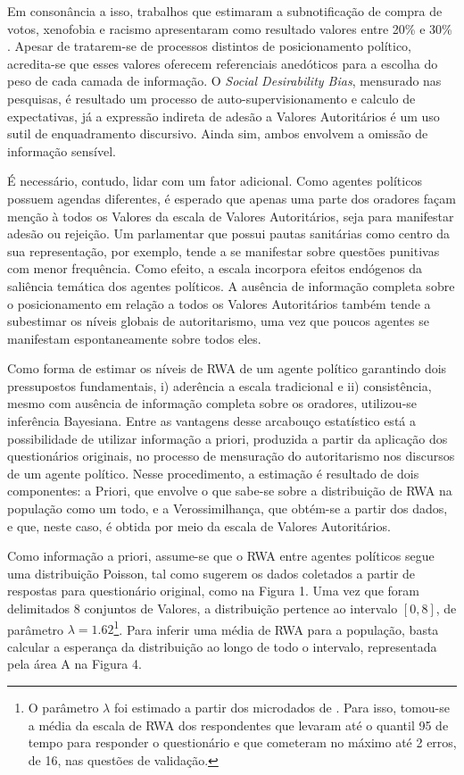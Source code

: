 \documentclass[
12pt,				%
openright,			%
twoside,			%
a4paper,			%
english,			%
french,				%
spanish,			%
brazil				%
]{abntex2}
\begin{document}
Em consonância a isso, trabalhos que estimaram a subnotificação de compra de votos, xenofobia e racismo apresentaram como resultado valores entre 20{\%} e 30{\%} \cite{rudmin1999norwegian,heerwig2009education,gonzalez2012vote}. 
Apesar de tratarem-se de processos distintos de posicionamento político, acredita-se que esses valores oferecem referenciais anedóticos para a escolha do peso de cada camada de informação. O \emph{Social Desirability Bias}, mensurado nas pesquisas, é resultado um processo de auto-supervisionamento e calculo de expectativas, já a expressão indireta de adesão a Valores Autoritários é um uso sutil de enquadramento discursivo. Ainda sim, ambos envolvem a omissão de informação sensível.

É necessário, contudo, lidar com um fator adicional. Como agentes políticos possuem agendas diferentes, é esperado que apenas uma parte dos oradores façam menção à todos os Valores da escala de Valores Autoritários, seja para manifestar adesão ou rejeição. Um parlamentar que possui pautas sanitárias como centro da sua representação, por exemplo, tende a se manifestar sobre questões punitivas com menor frequência. Como efeito, a escala incorpora efeitos endógenos da saliência temática dos agentes políticos. A ausência de informação completa sobre o posicionamento em relação a todos os Valores Autoritários também tende a subestimar os níveis globais de autoritarismo, uma vez que poucos agentes se manifestam espontaneamente sobre todos eles. 

Como forma de estimar os níveis de RWA de um agente político garantindo dois pressupostos fundamentais, i) aderência a escala tradicional e ii) consistência, mesmo com ausência de informação completa sobre os oradores, utilizou-se inferência Bayesiana. Entre as vantagens desse arcabouço estatístico está a possibilidade de utilizar informação a priori, produzida a partir da aplicação dos questionários originais, no processo de mensuração do autoritarismo nos discursos de um agente político. Nesse procedimento, a estimação é resultado de dois componentes: a Priori, que envolve o que sabe-se sobre a distribuição de RWA na população como um todo, e a Verossimilhança, que obtém-se a partir dos dados, e que, neste caso, é obtida por meio da escala de Valores Autoritários. 

Como informação a priori, assume-se que o RWA entre agentes políticos segue uma distribuição Poisson, tal como sugerem os dados coletados a partir de respostas para questionário original, como na Figura 1. Uma vez que foram delimitados 8 conjuntos de Valores, a distribuição pertence ao intervalo $[0, 8]$, de parâmetro $\lambda = 1.62$\footnote{O parâmetro $\lambda$ foi estimado a partir dos microdados de . Para isso, tomou-se a média da escala de RWA dos respondentes que levaram até o quantil 95 de tempo para responder o questionário e que cometeram no máximo até 2 erros, de 16, nas questões de validação.}. Para inferir uma média de RWA para a população, basta calcular a esperança da distribuição ao longo de todo o intervalo, representada pela área A na Figura 4.
\end{document}
